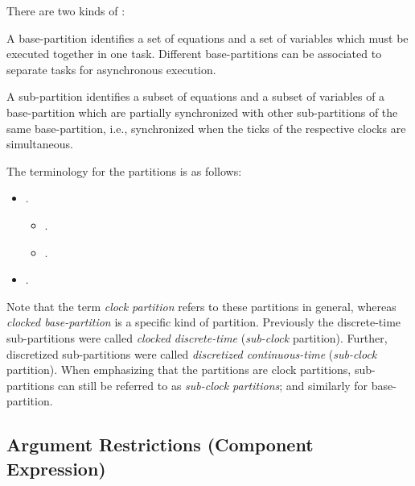 There are two kinds of :

\begin{definition}
A base-partition identifies a set of equations and a set of variables which must be executed together in one task.
Different base-partitions can be associated to separate tasks for asynchronous execution.
\end{definition}

\begin{definition}
A sub-partition identifies a subset of equations and a subset of variables of a base-partition which are partially synchronized with other sub-partitions of the same base-partition, i.e., synchronized when the ticks of the respective clocks are simultaneous.
\end{definition}

The terminology for the partitions is as follows:
\begin{itemize}
\item
  .
  \begin{itemize}
  \item {}.
  \item {}.
  \end{itemize}
\item
  .
\end{itemize}
\begin{nonnormative}
Note that the term \emph{clock partition} refers to these partitions in general, whereas \emph{clocked base-partition} is a specific kind of partition.
Previously the discrete-time sub-partitions were called \emph{clocked discrete-time} (\emph{sub-clock} partition).
Further, discretized sub-partitions were called \emph{discretized continuous-time} (\emph{sub-clock} partition).
When emphasizing that the partitions are clock partitions, sub-partitions can still be referred to as \emph{sub-clock partitions}; and similarly for base-partition.
\end{nonnormative}

\subsection{Argument Restrictions (Component Expression)}\label{argument-restrictions-component-expression}

